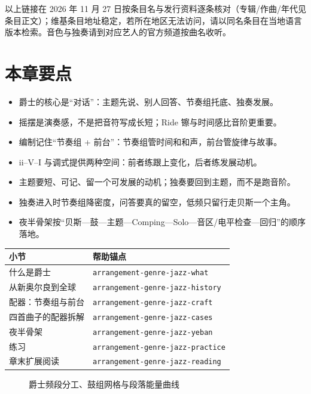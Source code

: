 以上链接在 2026 年 11 月 27 日按条目名与发行资料逐条核对（专辑/作曲/年代见条目正文）；维基条目地址稳定，若所在地区无法访问，请以同名条目在当地语言版本检索。音色与独奏请到对应艺人的官方频道按曲名收听。

\section{本章要点}
\label{sec:jazz-takeaways}

\begin{itemize}
\item 爵士的核心是“对话”：主题先说、别人回答、节奏组托底、独奏发展。
\item 摇摆是演奏感，不是把音符写成长短；Ride 镲与时间感比音阶更重要。
\item 编制记住“节奏组 + 前台”：节奏组管时间和和声，前台管旋律与故事。
\item ii–V–I 与调式提供两种空间：前者练跟上变化，后者练发展动机。
\item 主题要短、可记、留一个可发展的动机；独奏要回到主题，而不是跑音阶。
\item 独奏进入时节奏组降密度，问答要真的留空，低频只留行走贝斯一个主角。
\item 夜半骨架按“贝斯—鼓—主题—Comping—Solo—音区/电平检查—回归”的顺序落地。
\end{itemize}

\begin{helpmapping}
\begin{longtable}{p{}p{}}
\toprule
小节 & 帮助锚点 \\
\midrule
什么是爵士 & \texttt{arrangement-genre-jazz-what} \\
从新奥尔良到全球 & \texttt{arrangement-genre-jazz-history} \\
配器：节奏组与前台 & \texttt{arrangement-genre-jazz-craft} \\
四首曲子的配器拆解 & \texttt{arrangement-genre-jazz-cases} \\
夜半骨架 & \texttt{arrangement-genre-jazz-yeban} \\
练习 & \texttt{arrangement-genre-jazz-practice} \\
章末扩展阅读 & \texttt{arrangement-genre-jazz-reading} \\
\bottomrule
\end{longtable}
\end{helpmapping}

\begin{figure}[htbp]\centering
{}
\caption{爵士频段分工、鼓组网格与段落能量曲线}
\end{figure}
